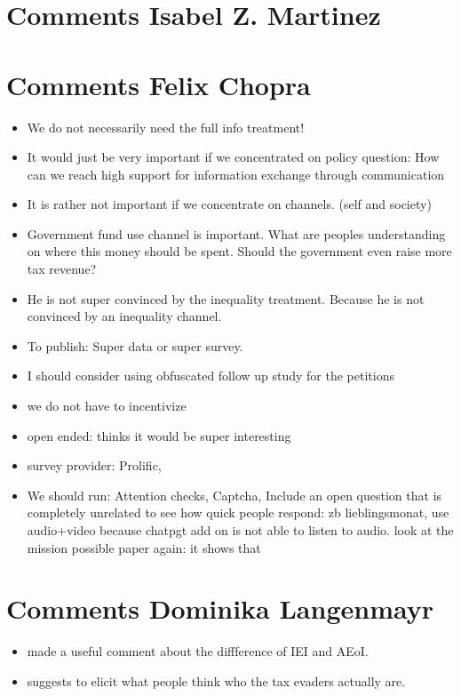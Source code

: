 \documentclass{article}
\begin{document}
\section{Comments Isabel Z. Martinez}



\section{Comments Felix Chopra}
\begin{itemize}
    \item We do not necessarily need the full info treatment!
    \item It would just be very important if we concentrated on policy question: How can we reach high support for information exchange through communication
    \item It is rather not important if we concentrate on channels. (self and society)
    \item Government fund use channel is important. What are peoples understanding on where this money should be spent. Should the government even raise more tax revenue? 
    \item He is not super convinced by the inequality treatment. Because he is not convinced by an inequality channel. 
    \item To publish: Super data or super survey. 
    \item I should consider using obfuscated follow up study for the petitions
    \item we do not have to incentivize
    \item open ended: thinks it would be super interesting
    \item survey provider: Prolific, 
    \item We should run: Attention checks, Captcha, Include an open question that is completely unrelated to see how quick people respond: zb lieblingsmonat, use audio+video because chatpgt add on is not able to listen to audio. 
look at the mission possible paper again: it shows that 
\end{itemize}


\section{Comments Dominika Langenmayr}
\begin{itemize}
    \item made a useful comment about the diffference of IEI and AEoI.
    \item suggests to elicit what people think who the tax evaders actually are.
\end{itemize}
\end{document}
